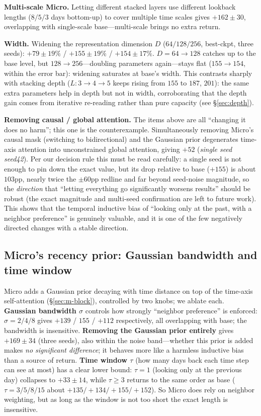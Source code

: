 \documentclass[a4paper,11pt]{article}
\begin{document}
\textbf{Multi-scale Micro.} Letting different stacked layers use
different lookback lengths ($8/5/3$ days bottom-up) to cover multiple time
scales gives $+162\pm30$, overlapping with single-scale base---multi-scale
brings no extra return.

\textbf{Width.} Widening the representation dimension $D$
($64/128/256$, best-ckpt, three seeds): $+79\pm19\%$ / $+155\pm19\%$ /
$+154\pm17\%$. $D{=}64\to128$ catches up to the base level, but
$128\to256$---doubling parameters again---stays flat ($155\to154$, within the
error bar): widening saturates at base's width. This contrasts sharply with
stacking depth ($L{:}3\to4\to5$ keeps rising from $155$ to $187$, $201$): the
same extra parameters help in depth but not in width, corroborating that the
depth gain comes from iterative re-reading rather than pure capacity
(see \S\ref{sec:depth}).

\textbf{Removing causal / global attention.} The items above are all
``changing it does no harm''; this one is the counterexample. Simultaneously
removing Micro's causal mask (switching to bidirectional) and the Gaussian
prior degenerates time-axis attention into unconstrained global attention,
giving $+52$ (\emph{single seed seed42}). Per our decision rule this must be
read carefully: a single seed is not enough to pin down the exact value, but
its drop relative to base ($+155$) is about $103$pp, nearly twice the
$\pm60$pp redline and far beyond seed-noise magnitude, so the
\emph{direction} that ``letting everything go significantly worsens results''
should be robust (the exact magnitude and multi-seed confirmation are left to
future work). This shows that the temporal inductive bias of ``looking only at
the past, with a neighbor preference'' is genuinely valuable, and it is one of
the few negatively directed changes with a stable direction.

\subsection{Micro's recency prior: Gaussian bandwidth and time window}\label{sec:abl-micro}
Micro adds a Gaussian prior decaying with time distance on top of the
time-axis self-attention (\S\ref{sec:m-block}), controlled by two knobs; we
ablate each. \textbf{Gaussian bandwidth $\sigma$} controls how strongly
``neighbor preference'' is enforced: $\sigma{=}2/4/8$ gives $+139$ / $155$ /
$+112$ respectively, all overlapping with base; the bandwidth is insensitive.
\textbf{Removing the Gaussian prior entirely} gives $+169\pm34$ (three
seeds), also within the noise band---whether this prior is added makes
\emph{no significant difference}; it behaves more like a harmless inductive
bias than a source of return. \textbf{Time window $\tau$} (how many days
back each time step can see at most) has a clear lower bound: $\tau{=}1$
(looking only at the previous day) collapses to $+33\pm14$, while $\tau\ge3$
returns to the same order as base ($\tau{=}3/5/8/15$ about
$+135/+134/+155/+152$). So Micro does rely on neighbor weighting, but as long
as the window is not too short the exact length is insensitive.
\end{document}
